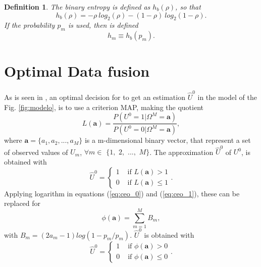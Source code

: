 \documentclass[journal]{IEEEtran}
\newtheorem{definition}[theorem]{Definition}
\begin{document}
\begin{definition}
 \label{def:hb}
The binary entropy is defined as $h_b(\rho)$, so that
\begin{equation}
\label{eq:hb1}
h_b(\rho)=- \rho ~ log_2(\rho) - (1-\rho) ~ log_2(1-\rho).
\end{equation}
If the probability $p_m$ is used, then is defined
\begin{equation}
\label{eq:hi}
h_m \equiv h_b(p_m).
\end{equation}
\end{definition}

 
\section{Optimal Data fusion} 
\label{sec:Optimal}
As is seen in \cite{optimal}, an optimal decision for to get an estimation $\hat{U}^0$ 
in the model of the Fig. \ref{fig:modelo}, is to use a criterion MAP, making 
the quotient
\begin{equation}\label{eq:ceo_0}
L(\mathbf{a})=\frac{P(U^0=1|\Omega^{M}=\mathbf{a})}{P(U^0=0|\Omega^{M}=\mathbf{a})} ,
\end{equation}
where $\mathbf{a}=\{a_1, a_2, ..., a_M\}$ is a m-dimensional binary vector, that 
represent a set of observed values of $U_m$, $\forall m \in$ $\{1,$ $2,$ $...,$ $M\}$.
The  approximation $\hat{U}^0$ of $U^0$, is obtained with
\begin{equation}\label{eq:ceo_1}
\hat{U}^0=
\begin{cases}
1 & \text{ if } L(\mathbf{a}) > 1 \\ 
0 & \text{ if } L(\mathbf{a}) \leq 1
\end{cases}.
\end{equation}
Applying logarithm in equations (\ref{eq:ceo_0}) and (\ref{eq:ceo_1}), these
can be replaced for
\begin{equation}\label{eq:ceo_2}
\phi(\mathbf{a})=\sum_{m=1}^{M}  B_m,
\end{equation}
with $B_m=(2 a_m-1) log({1-p_m}/{p_m})$. $\hat{U}^0$ is obtained with
\begin{equation}\label{eq:ceo_3}
\hat{U}^0=
\begin{cases}
1 & \text{ if } \phi(\mathbf{a}) > 0 \\ 
0 & \text{ if } \phi(\mathbf{a}) \leq 0
\end{cases}.
\end{equation}
\end{document}
